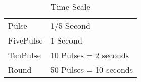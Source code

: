 \begin{table}[hb]
\caption{Time Scale}
\centering
	\begin{tabular}{||l|l||} \hline
	Pulse      & 1/5 Second	\\
	FivePulse  & 1 Second   	\\
	TenPulse   & 10 Pulses = 2 seconds	\\
	Round      & 50 Pulses = 10 seconds	\\  \hline
	\end{tabular}
\end{table}
